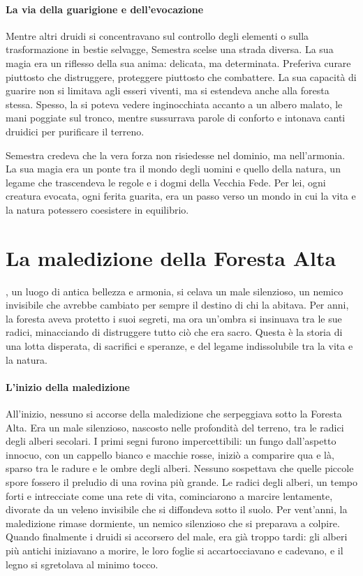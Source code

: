 \documentclass[letterpaper,twocolumn,openany,nodeprecatedcode]{dndbook}
\newcommand{\Cap}[2]{\DndDropCapLine{#1}{#2}}
\begin{document}
\paragraph{La via della guarigione e dell’evocazione}

Mentre altri druidi si concentravano sul controllo degli elementi o sulla trasformazione in bestie selvagge, Semestra scelse una strada diversa. La sua magia era un riflesso della sua anima: delicata, ma determinata. Preferiva curare piuttosto che distruggere, proteggere piuttosto che combattere. La sua capacità di guarire non si limitava agli esseri viventi, ma si estendeva anche alla foresta stessa. Spesso, la si poteva vedere inginocchiata accanto a un albero malato, le mani poggiate sul tronco, mentre sussurrava parole di conforto e intonava canti druidici per purificare il terreno.

Semestra credeva che la vera forza non risiedesse nel dominio, ma nell’armonia. La sua magia era un ponte tra il mondo degli uomini e quello della natura, un legame che trascendeva le regole e i dogmi della Vecchia Fede. Per lei, ogni creatura evocata, ogni ferita guarita, era un passo verso un mondo in cui la vita e la natura potessero coesistere in equilibrio.

\section{La maledizione della Foresta Alta}

\Cap{N}{ella Foresta Alta}, un luogo di antica bellezza e armonia, si celava un male silenzioso, un nemico invisibile che avrebbe cambiato per sempre il destino di chi la abitava. Per anni, la foresta aveva protetto i suoi segreti, ma ora un'ombra si insinuava tra le sue radici, minacciando di distruggere tutto ciò che era sacro. Questa è la storia di una lotta disperata, di sacrifici e speranze, e del legame indissolubile tra la vita e la natura.

\paragraph{L’inizio della maledizione}  
All’inizio, nessuno si accorse della maledizione che serpeggiava sotto la Foresta Alta. Era un male silenzioso, nascosto nelle profondità del terreno, tra le radici degli alberi secolari. I primi segni furono impercettibili: un fungo dall’aspetto innocuo, con un cappello bianco e macchie rosse, iniziò a comparire qua e là, sparso tra le radure e le ombre degli alberi. Nessuno sospettava che quelle piccole spore fossero il preludio di una rovina più grande. Le radici degli alberi, un tempo forti e intrecciate come una rete di vita, cominciarono a marcire lentamente, divorate da un veleno invisibile che si diffondeva sotto il suolo. Per vent’anni, la maledizione rimase dormiente, un nemico silenzioso che si preparava a colpire. Quando finalmente i druidi si accorsero del male, era già troppo tardi: gli alberi più antichi iniziavano a morire, le loro foglie si accartocciavano e cadevano, e il legno si sgretolava al minimo tocco.
\end{document}
